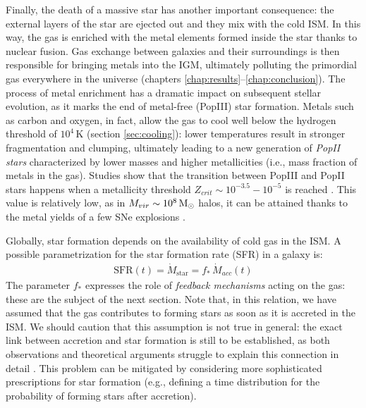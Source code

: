   Finally, the death of a massive star has another important consequence: the external layers of the star are ejected out and they mix with the cold ISM. In this way, the gas is enriched with the metal elements formed inside the star thanks to nuclear fusion. Gas exchange between galaxies and their surroundings is then responsible for bringing metals into the IGM, ultimately polluting the primordial gas everywhere in the universe (chapters \ref{chap:results}--\ref{chap:conclusion}). The process of metal enrichment has a dramatic impact on subsequent stellar evolution, as it marks the end of metal-free (PopIII) star formation. Metals such as carbon and oxygen, in fact, allow the gas to cool well below the hydrogen threshold of $10^4\,\mathrm{K}$ (section \ref{sec:cooling}): lower temperatures result in stronger fragmentation and clumping, ultimately leading to a new generation of \textit{PopII stars} characterized by lower masses and higher metallicities (i.e., mass fraction of metals in the gas). Studies show that the transition between PopIII and PopII stars happens when a metallicity threshold $Z_{crit}\sim 10^{-3.5}-10^{-5}$ is reached \citep{bromm2001fragmentation}. This value is relatively low, as in $M_{vir}\sim10^8\,{\rm M}_{\odot}$ halos, it can be attained thanks to the metal yields of a few SNe explosions \citep{karlsson2008uncovering}.
  
  Globally, star formation depends on the availability of cold gas in the ISM. A possible parametrization for the star formation rate (SFR) in a galaxy is:
  \begin{align}
    \mathrm{SFR}(t) = \dot{M}_\mathrm{star} = f_* \,\dot{M}_{acc}(t) \label{eq:feedback_parameter}
  \end{align}
  The parameter $f_*$ expresses the role of \textit{feedback mechanisms} acting on the gas: these are the subject of the next section.
  Note that, in this relation, we have assumed that the gas contributes to forming stars as soon as it is accreted in the ISM. We should caution that this assumption is not true in general: the exact link between accretion and star formation is still to be established, as both observations and theoretical arguments struggle to explain this connection in detail \citep[e.g.,][]{almeida2016}. This problem can be mitigated by considering more sophisticated prescriptions for star formation (e.g., defining a time distribution for the probability of forming stars after accretion). 
  

